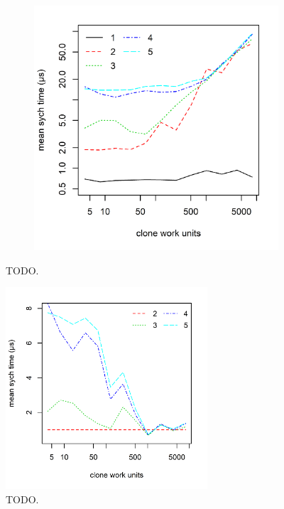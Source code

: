 \begin{figure}
{\begin{subfigure}[b]{0.63\textwidth}
		\includegraphics[width=\textwidth]{experiments/clone_compete_1.png}
		\caption{}
		\label{fig:clone_compete_1}
	\end{subfigure}%
}
\caption[TODO]{TODO.}
\label{fig:clone_compete}
\end{figure}

\begin{figure}
	\centering
	\includegraphics[width=0.67\textwidth]{experiments/clone_compete_2.png}
	\caption[TODO]{TODO.}
	\label{fig:clone_compete_3}
\end{figure}


